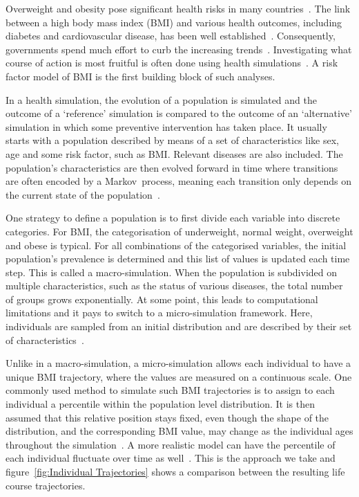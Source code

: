 \documentclass{imammb}
\numberwithin{equation}{section}
\begin{document}
Overweight and obesity pose significant health risks in many countries~\citep{Dai2020}. The link between a high body mass index (BMI) and various health outcomes, including diabetes and cardiovascular disease, has been well established~\citep{Murray2020}. Consequently, governments spend much effort to curb the increasing trends~\citep{VWS2018, VanRinsum2018}. Investigating what course of action is most fruitful is often done using health simulations~\citep{Levy2011}. A risk factor model of BMI is the first building block of such analyses.

In a health simulation, the evolution of a population is simulated and the outcome of a `reference' simulation is compared to the outcome of an `alternative' simulation in which some preventive intervention has taken place. It usually starts with a population described by means of a set of characteristics like sex, age and some risk factor, such as BMI. Relevant diseases are also included. The population's characteristics are then evolved forward in time where transitions are often encoded by a \mbox{Markov process}, meaning each transition only depends on the current state of the population~\citep{Sonnenberg1993}.

One strategy to define a population is to first divide each variable into discrete categories. For BMI, the categorisation of underweight, normal weight, overweight and obese is typical. For all combinations of the categorised variables, the initial population's prevalence is determined and this list of values is updated each time step. This is called a macro-simulation. When the population is subdivided on multiple characteristics, such as the status of various diseases, the total number of groups grows exponentially. At some point, this leads to computational limitations and it pays to switch to a micro-simulation framework. Here, individuals are sampled from an initial distribution and are described by their set of characteristics~\citep{Levy2011}.

Unlike in a macro-simulation, a micro-simulation allows each individual to have a unique BMI trajectory, where the values are measured on a continuous scale. One commonly used method to simulate such BMI trajectories is to assign to each individual a percentile within the population level distribution. It is then assumed that this relative position stays fixed, even though the shape of the distribution, and the corresponding BMI value, may change as the individual ages throughout the simulation~\citep{McPherson2007, OECD2019}. A more realistic model can have the percentile of each individual fluctuate over time as well~\citep{Vuik2021}. This is the approach we take and figure~\ref{fig:Individual Trajectories} shows a comparison between the resulting life course trajectories.
\end{document}
